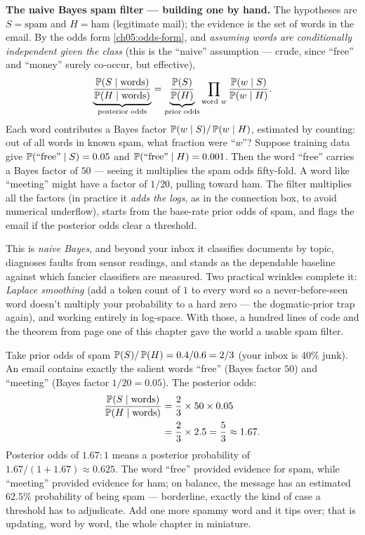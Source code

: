 \begin{applicationbox}
\textbf{The naive Bayes spam filter --- building one by hand.}
The hypotheses are $S = \text{spam}$ and $H = \text{ham}$ (legitimate mail); the
evidence is the set of words in the email. By the odds form \eqref{ch05:odds-form}, and
\emph{assuming words are conditionally independent given the class} (this is the ``naive''
assumption --- crude, since ``free'' and ``money'' surely co-occur, but
effective),
\[
  \underbrace{\frac{\P(S\given \text{words})}{\P(H\given \text{words})}}_{\text{posterior odds}}
  = \underbrace{\frac{\P(S)}{\P(H)}}_{\text{prior odds}}
    \prod_{\text{word } w}\frac{\P(w\given S)}{\P(w\given H)}.
\]
Each word contributes a Bayes factor $\P(w\given S)/\P(w\given H)$, estimated by counting:
out of all words in known spam, what fraction were ``$w$''? Suppose training data give
$\P(\text{``free''}\given S)=0.05$ and $\P(\text{``free''}\given H)=0.001$. Then the word
``free'' carries a Bayes factor of $50$ --- seeing it multiplies the spam odds fifty-fold.
A word like ``meeting'' might have a factor of $1/20$, pulling toward ham. The filter
multiplies all the factors (in practice it \emph{adds the logs}, as in the
connection box, to avoid numerical underflow), starts from the base-rate prior odds of
spam, and flags the email if the posterior odds clear a threshold.

This is \emph{naive Bayes}, and beyond your inbox it classifies documents by topic,
diagnoses faults from sensor readings, and stands as the dependable baseline against which
fancier classifiers are measured. Two practical wrinkles complete it: \emph{Laplace
smoothing} (add a token count of $1$ to every word so a never-before-seen word doesn't
multiply your probability to a hard zero --- the dogmatic-prior trap again), and working
entirely in log-space. With those, a hundred lines of code and the theorem from page one
of this chapter gave the world a usable spam filter.
\end{applicationbox}

\begin{example}
\label{ch05:ex-spam}
Take prior odds of spam $\P(S)/\P(H) = 0.4/0.6 = 2/3$ (your inbox is $40\%$ junk). An
email contains exactly the salient words ``free'' (Bayes factor $50$) and ``meeting''
(Bayes factor $1/20 = 0.05$). The posterior odds:
\begin{align*}
  \frac{\P(S\given\text{words})}{\P(H\given\text{words})}
  &= \frac23 \times 50 \times 0.05 \\
  &= \frac23 \times 2.5 = \frac{5}{3} \approx 1.67.
\end{align*}
Posterior odds of $1.67{:}1$ means a posterior probability of
$1.67/(1+1.67)\approx 0.625$. The word ``free'' provided evidence for spam, while
``meeting'' provided evidence for ham; on balance, the message has an estimated
$62.5\%$ probability of being spam --- borderline, exactly the kind of case a threshold
has to adjudicate. Add one more spammy word and it tips over; that is updating,
word by word, the whole chapter in miniature.
\end{example}

